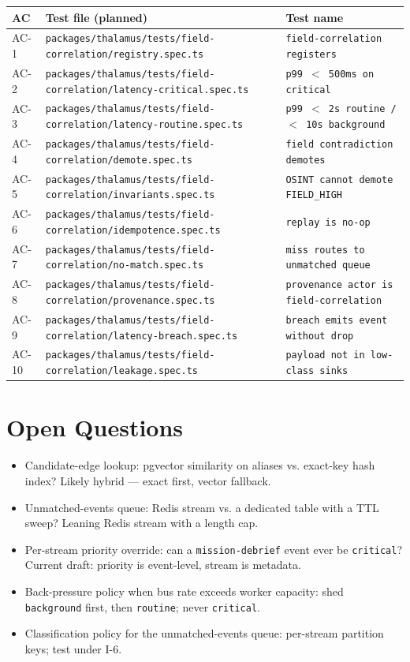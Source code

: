 \begin{center}
\begin{tabular}{@{}lll@{}}
\toprule
AC & Test file (planned) & Test name \\
\midrule
AC-1  & \texttt{packages/thalamus/tests/field-correlation/registry.spec.ts}         & \texttt{field-correlation registers} \\
AC-2  & \texttt{packages/thalamus/tests/field-correlation/latency-critical.spec.ts} & \texttt{p99 $<$ 500ms on critical} \\
AC-3  & \texttt{packages/thalamus/tests/field-correlation/latency-routine.spec.ts}  & \texttt{p99 $<$ 2s routine / $<$ 10s background} \\
AC-4  & \texttt{packages/thalamus/tests/field-correlation/demote.spec.ts}           & \texttt{field contradiction demotes} \\
AC-5  & \texttt{packages/thalamus/tests/field-correlation/invariants.spec.ts}       & \texttt{OSINT cannot demote FIELD\_HIGH} \\
AC-6  & \texttt{packages/thalamus/tests/field-correlation/idempotence.spec.ts}      & \texttt{replay is no-op} \\
AC-7  & \texttt{packages/thalamus/tests/field-correlation/no-match.spec.ts}         & \texttt{miss routes to unmatched queue} \\
AC-8  & \texttt{packages/thalamus/tests/field-correlation/provenance.spec.ts}       & \texttt{provenance actor is field-correlation} \\
AC-9  & \texttt{packages/thalamus/tests/field-correlation/latency-breach.spec.ts}   & \texttt{breach emits event without drop} \\
AC-10 & \texttt{packages/thalamus/tests/field-correlation/leakage.spec.ts}          & \texttt{payload not in low-class sinks} \\
\bottomrule
\end{tabular}
\end{center}

\section{Open Questions}
\begin{itemize}[leftmargin=1.2em]
  \item Candidate-edge lookup: pgvector similarity on aliases vs. exact-key hash index? Likely hybrid --- exact first, vector fallback.
  \item Unmatched-events queue: Redis stream vs. a dedicated table with a TTL sweep? Leaning Redis stream with a length cap.
  \item Per-stream priority override: can a \texttt{mission-debrief} event ever be \texttt{critical}? Current draft: priority is event-level, stream is metadata.
  \item Back-pressure policy when bus rate exceeds worker capacity: shed \texttt{background} first, then \texttt{routine}; never \texttt{critical}.
  \item Classification policy for the unmatched-events queue: per-stream partition keys; test under I-6.
\end{itemize}


